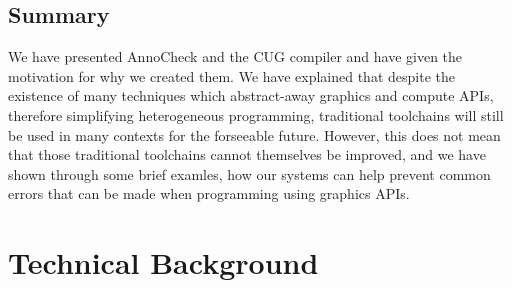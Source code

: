 \documentclass[a4paper,12pt,twoside,openright]{report}
\begin{document}



\section{Summary}

We have presented AnnoCheck and the CUG compiler and have given the motivation
for why we created them. We have explained that despite the existence of many
techniques which abstract-away graphics and compute APIs, therefore simplifying
heterogeneous programming, traditional toolchains will still be used in many
contexts for the forseeable future. However, this does not mean that those
traditional toolchains cannot themselves be improved, and we have shown through
some brief examles, how our systems can help prevent common errors that can be
made when programming using graphics APIs.

\chapter{Technical Background}

\label{chp:technical_background}



\end{document}
